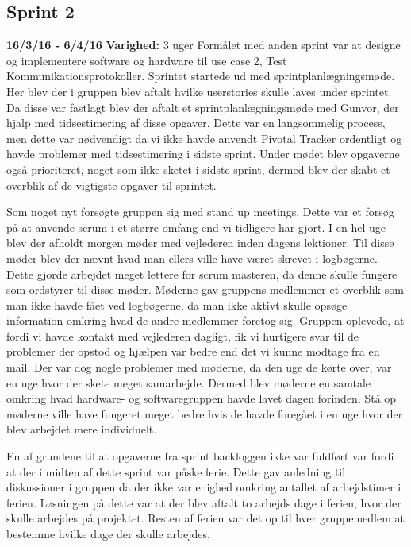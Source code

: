 	\subsection{Sprint 2}
	\textbf{16/3/16 - 6/4/16}\newline
	\textbf{Varighed:} 3 uger\newline
	Formålet med anden sprint var at designe og implementere software og hardware til use case 2, Test Kommunikationsprotokoller. Sprintet startede ud med sprintplanlægningsmøde. Her blev der i gruppen blev aftalt hvilke userstories skulle laves under sprintet. Da disse var fastlagt blev der aftalt et sprintplanlægningsmøde med Gunvor, der hjalp med tidsestimering af disse opgaver. Dette var en langsommelig process, men dette var nødvendigt da vi ikke havde anvendt Pivotal Tracker ordentligt og havde problemer med tidsestimering i sidste sprint. Under mødet blev opgaverne også prioriteret, noget som ikke sketet i sidste sprint, dermed blev der skabt et overblik af de vigtigste opgaver til sprintet. \newline
	
	Som noget nyt forsøgte gruppen sig med stand up meetings. Dette var et forsøg på at anvende scrum i et større omfang end vi tidligere har gjort. I en hel uge blev der afholdt morgen møder med vejlederen inden dagens lektioner. Til disse møder blev der nævnt hvad man ellers ville have været skrevet i logbøgerne. Dette gjorde arbejdet meget lettere for scrum masteren, da denne skulle fungere som ordstyrer til disse møder. Møderne gav gruppens medlemmer et overblik som man ikke havde fået ved logbøgerne, da man ikke aktivt skulle opsøge information omkring hvad de andre medlemmer foretog sig. Gruppen oplevede, at fordi vi havde kontakt med vejlederen dagligt, fik vi hurtigere svar til de problemer der opstod og hjælpen var bedre end det vi kunne modtage fra en mail. Der var dog nogle problemer med møderne, da den uge de kørte over, var en uge hvor der skete meget samarbejde. Dermed blev møderne en samtale omkring hvad hardware- og softwaregruppen havde lavet dagen forinden. Stå op møderne ville have fungeret meget bedre hvis de havde foregået i en uge hvor der blev arbejdet mere individuelt. \newline
	
	En af grundene til at opgaverne fra sprint backloggen ikke var fuldført var fordi at der i midten af dette sprint var påske ferie. Dette gav anledning til diskussioner i gruppen da der ikke var enighed omkring antallet af arbejdstimer i ferien. Løsningen på dette var at der blev aftalt to arbejds dage i ferien, hvor der skulle arbejdes på projektet. Resten af ferien var det op til hver gruppemedlem at bestemme hvilke dage der skulle arbejdes. \newline
	
